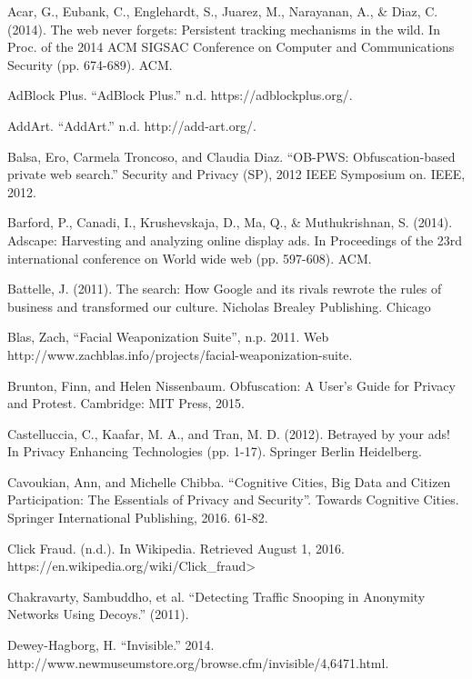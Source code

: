 \documentclass[conference]{IEEEtran}
\begin{document}
\begin{thebibliography}{99}

 Acar, G., Eubank, C., Englehardt, S., Juarez, M., Narayanan, A., \& Diaz, C. (2014). The web never forgets: Persistent tracking mechanisms in the wild. In Proc. of the 2014 ACM SIGSAC Conference on Computer and Communications Security (pp. 674-689). ACM.

 AdBlock Plus. ``AdBlock Plus.'' n.d. https://adblockplus.org/.

 AddArt. ``AddArt.'' n.d. http://add-art.org/.

 Balsa, Ero, Carmela Troncoso, and Claudia Diaz. ``OB-PWS: Obfuscation-based private web search.'' Security and Privacy (SP), 2012 IEEE Symposium on. IEEE, 2012.

 Barford, P., Canadi, I., Krushevskaja, D., Ma, Q., \& Muthukrishnan, S. (2014). Adscape: Harvesting and analyzing online display ads. In Proceedings of the 23rd international conference on World wide web (pp. 597-608). ACM.

 Battelle, J. (2011). The search: How Google and its rivals rewrote the rules of business and transformed our culture. Nicholas Brealey Publishing. Chicago

 Blas, Zach, ``Facial Weaponization Suite'', n.p. 2011. Web http://www.zachblas.info/projects/facial-weaponization-suite.

 Brunton, Finn, and Helen Nissenbaum. Obfuscation: A User's Guide for Privacy and Protest. Cambridge: MIT Press, 2015.

 Castelluccia, C., Kaafar, M. A., and Tran, M. D. (2012). Betrayed by your ads! In Privacy Enhancing Technologies (pp. 1-17). Springer Berlin Heidelberg.

 Cavoukian, Ann, and Michelle Chibba. ``Cognitive Cities, Big Data and Citizen Participation: The Essentials of Privacy and Security''. Towards Cognitive Cities. Springer International Publishing, 2016. 61-82.

 Click Fraud. (n.d.). In Wikipedia. Retrieved August 1, 2016. https://en.wikipedia.org/wiki/Click\_fraud>

 Chakravarty, Sambuddho, et al. ``Detecting Traffic Snooping in Anonymity Networks Using Decoys.'' (2011).

 Dewey-Hagborg, H. ``Invisible.'' 2014. http://www.newmuseumstore.org/browse.cfm/invisible/4,6471.html.


\end{thebibliography}
\end{document}
